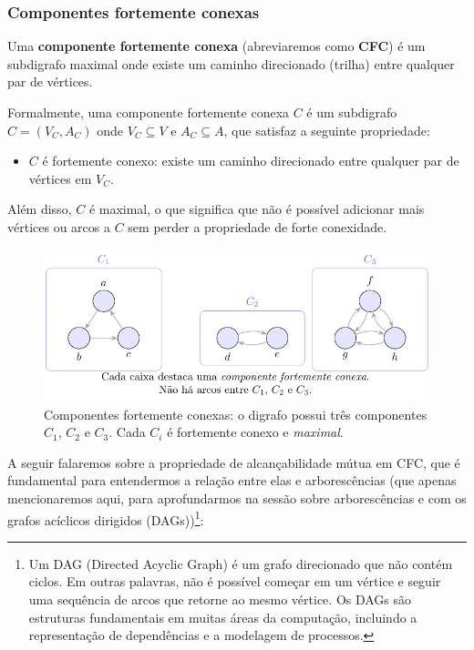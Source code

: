 \subsubsection{Componentes fortemente conexas}
Uma \textbf{componente fortemente conexa} (abreviaremos como \textbf{CFC}) é um subdigrafo maximal onde existe um caminho direcionado (trilha) entre qualquer par de vértices.


Formalmente, uma componente fortemente conexa \(C\) é um subdigrafo \(C = (V_C, A_C)\) onde \(V_C \subseteq V\) e \(A_C \subseteq A\), que satisfaz a seguinte propriedade:
\begin{itemize}
	\item \(C\) é fortemente conexo: existe um caminho direcionado entre qualquer par de vértices em \(V_C\).
\end{itemize}
Além disso, \(C\) é maximal, o que significa que não é possível adicionar mais vértices ou arcos a \(C\) sem perder a propriedade de forte conexidade.

\begin{figure}[H]
	\centering
	\includegraphics[width=0.9\linewidth]{figures/figure_028.pdf}

	\caption{Componentes fortemente conexas: o digrafo possui três componentes $C_1$, $C_2$ e $C_3$. Cada $C_i$ é fortemente conexo e \emph{maximal}.}
\end{figure}



A seguir falaremos sobre a propriedade de alcançabilidade mútua em CFC, que é fundamental para entendermos a relação entre elas e arborescências (que apenas mencionaremos aqui, para aprofundarmos na sessão sobre arborescências e com os grafos acíclicos dirigidos (DAGs))\footnote{Um DAG (Directed Acyclic Graph) é um grafo direcionado que não contém ciclos. Em outras palavras, não é possível começar em um vértice e seguir uma sequência de arcos que retorne ao mesmo vértice. Os DAGs são estruturas fundamentais em muitas áreas da computação, incluindo a representação de dependências e a modelagem de processos.}:

